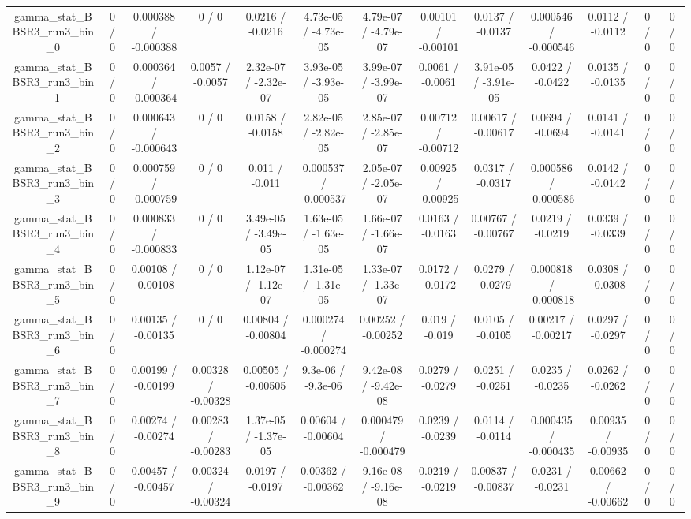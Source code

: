 \documentclass[10pt]{article}
\begin{document}
\begin{table}[htbp]
\begin{center}
\begin{tabular}{|c|c|c|c|c|c|c|c|c|c|c|c|c|}
  gamma_stat_BBSR3_run3_bin_0 & 0 / 0 & 0.000388 / -0.000388 & 0 / 0 & 0.0216 / -0.0216 & 4.73e-05 / -4.73e-05 & 4.79e-07 / -4.79e-07 & 0.00101 / -0.00101 & 0.0137 / -0.0137 & 0.000546 / -0.000546 & 0.0112 / -0.0112 & 0 / 0 & 0 / 0 \\ 
  gamma_stat_BBSR3_run3_bin_1 & 0 / 0 & 0.000364 / -0.000364 & 0.0057 / -0.0057 & 2.32e-07 / -2.32e-07 & 3.93e-05 / -3.93e-05 & 3.99e-07 / -3.99e-07 & 0.0061 / -0.0061 & 3.91e-05 / -3.91e-05 & 0.0422 / -0.0422 & 0.0135 / -0.0135 & 0 / 0 & 0 / 0 \\ 
  gamma_stat_BBSR3_run3_bin_2 & 0 / 0 & 0.000643 / -0.000643 & 0 / 0 & 0.0158 / -0.0158 & 2.82e-05 / -2.82e-05 & 2.85e-07 / -2.85e-07 & 0.00712 / -0.00712 & 0.00617 / -0.00617 & 0.0694 / -0.0694 & 0.0141 / -0.0141 & 0 / 0 & 0 / 0 \\ 
  gamma_stat_BBSR3_run3_bin_3 & 0 / 0 & 0.000759 / -0.000759 & 0 / 0 & 0.011 / -0.011 & 0.000537 / -0.000537 & 2.05e-07 / -2.05e-07 & 0.00925 / -0.00925 & 0.0317 / -0.0317 & 0.000586 / -0.000586 & 0.0142 / -0.0142 & 0 / 0 & 0 / 0 \\ 
  gamma_stat_BBSR3_run3_bin_4 & 0 / 0 & 0.000833 / -0.000833 & 0 / 0 & 3.49e-05 / -3.49e-05 & 1.63e-05 / -1.63e-05 & 1.66e-07 / -1.66e-07 & 0.0163 / -0.0163 & 0.00767 / -0.00767 & 0.0219 / -0.0219 & 0.0339 / -0.0339 & 0 / 0 & 0 / 0 \\ 
  gamma_stat_BBSR3_run3_bin_5 & 0 / 0 & 0.00108 / -0.00108 & 0 / 0 & 1.12e-07 / -1.12e-07 & 1.31e-05 / -1.31e-05 & 1.33e-07 / -1.33e-07 & 0.0172 / -0.0172 & 0.0279 / -0.0279 & 0.000818 / -0.000818 & 0.0308 / -0.0308 & 0 / 0 & 0 / 0 \\ 
  gamma_stat_BBSR3_run3_bin_6 & 0 / 0 & 0.00135 / -0.00135 & 0 / 0 & 0.00804 / -0.00804 & 0.000274 / -0.000274 & 0.00252 / -0.00252 & 0.019 / -0.019 & 0.0105 / -0.0105 & 0.00217 / -0.00217 & 0.0297 / -0.0297 & 0 / 0 & 0 / 0 \\ 
  gamma_stat_BBSR3_run3_bin_7 & 0 / 0 & 0.00199 / -0.00199 & 0.00328 / -0.00328 & 0.00505 / -0.00505 & 9.3e-06 / -9.3e-06 & 9.42e-08 / -9.42e-08 & 0.0279 / -0.0279 & 0.0251 / -0.0251 & 0.0235 / -0.0235 & 0.0262 / -0.0262 & 0 / 0 & 0 / 0 \\ 
  gamma_stat_BBSR3_run3_bin_8 & 0 / 0 & 0.00274 / -0.00274 & 0.00283 / -0.00283 & 1.37e-05 / -1.37e-05 & 0.00604 / -0.00604 & 0.000479 / -0.000479 & 0.0239 / -0.0239 & 0.0114 / -0.0114 & 0.000435 / -0.000435 & 0.00935 / -0.00935 & 0 / 0 & 0 / 0 \\ 
  gamma_stat_BBSR3_run3_bin_9 & 0 / 0 & 0.00457 / -0.00457 & 0.00324 / -0.00324 & 0.0197 / -0.0197 & 0.00362 / -0.00362 & 9.16e-08 / -9.16e-08 & 0.0219 / -0.0219 & 0.00837 / -0.00837 & 0.0231 / -0.0231 & 0.00662 / -0.00662 & 0 / 0 & 0 / 0 \\ 

\end{tabular}
\end{center}
\end{table}
\end{document}
